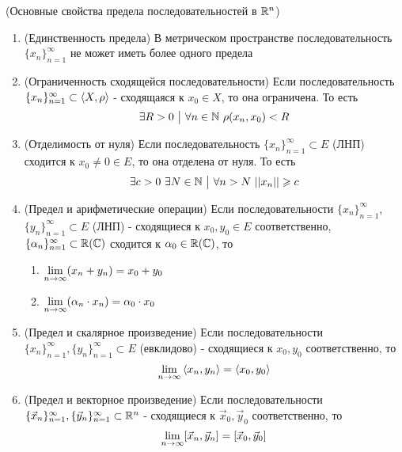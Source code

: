 \begin{theorem} (Основные свойства предела последовательностей в $\mathbb{R}^n$)
	\begin{enumerate}
		\item (Единственность предела) В метрическом пространстве последовательность $\{x_n\}_{n = 1}^\infty$ не может иметь более одного предела
		
		\item (Ограниченность сходящейся последовательности) Если последовательность $\{x_n\}_{n = 1}^\infty \subset \left\langle X, \rho\right\rangle$ - сходящаяся к $x_0 \in X$, то она ограничена. То есть
		\[
			\exists R > 0 \ \big|\  \forall n \in \mathbb{N}\ \rho(x_n, x_0) < R
		\] 
		
		\item (Отделимость от нуля) Если последовательность $\{x_n\}_{n = 1}^\infty \subset E$ (ЛНП) сходится к $x_0 \neq 0 \in E$, то она отделена от нуля. То есть
		\[
			\exists c > 0\ \exists N \in \mathbb{N} \ \big|\  \forall n > N\ ||x_n|| \geqslant c
		\]
		
		\item (Предел и арифметические операции) Если последовательности $\{x_n\}_{n = 1}^\infty$, $\{y_n\}_{n = 1}^\infty \subset E$ (ЛНП) - сходящиеся к $x_0, y_0 \in E$ соответственно, $\{\alpha_n\}_{n = 1}^\infty \subset \mathbb{R}(\mathbb{C})$ сходится к $\alpha_0 \in \mathbb{R}(\mathbb{C})$, то
		\begin{enumerate}
			\item $\lim\limits_{n \to \infty} (x_n + y_n) = x_0 + y_0$
			
			\item $\lim\limits_{n \to \infty} (\alpha_n \cdot x_n) = \alpha_0 \cdot x_0$
		\end{enumerate}
	
	\item (Предел и скалярное произведение) Если последовательности $\{x_n\}_{n = 1}^\infty, \{y_n\}_{n = 1}^\infty \subset E$ (евклидово) - сходящиеся к $x_0, y_0$ соответственно, то
	\[
		\lim\limits_{n \to \infty} \left\langle x_n, y_n\right\rangle = \left\langle x_0, y_0\right\rangle
	\]
	
	\item (Предел и векторное произведение) Если последовательности $\{\vec{x}_n\}_{n = 1}^\infty, \{\vec{y}_n\}_{n = 1}^\infty \subset \mathbb{R}^n$ - сходящиеся к $\vec{x}_0, \vec{y}_0$ соответственно, то
	\[
		\lim\limits_{n \to \infty} [\vec{x}_n, \vec{y}_n] = [\vec{x}_0, \vec{y}_0]
	\]
	\end{enumerate}
\end{theorem}

